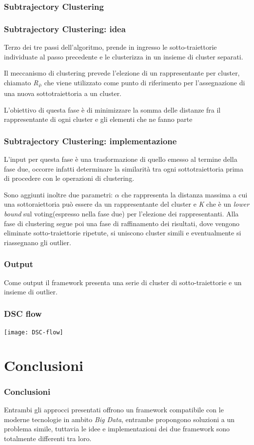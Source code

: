 \documentclass{beamer}
\begin{document}
\subsubsection{Subtrajectory Clustering}

\begin{frame}
		\frametitle{Subtrajectory Clustering: idea}
		Terzo dei tre passi dell'algoritmo, prende in ingresso le sotto-traiettorie individuate al passo precedente e le clusterizza in un insieme di cluster separati.
		
		Il meccanismo di clustering prevede l'elezione di un rappresentante per cluster, chiamato \textit{R\textsubscript{i}}, che viene utilizzato come punto di riferimento per l'assegnazione di una nuova sottotraiettoria a un cluster.
		
		L'obiettivo di questa fase  è di minimizzare la somma delle distanze fra il rappresentante di ogni cluster e gli elementi che ne fanno parte
\end{frame}

\begin{frame}
	\frametitle{Subtrajectory Clustering: implementazione}
 	L'input per questa fase è una trasformazione di quello emesso al termine della fase due, occorre infatti determinare la similarità tra ogni sottotraiettoria prima di procedere con le operazioni di clustering.
 	
 	Sono aggiunti inoltre due parametri: $\alpha$ che rappresenta la distanza massima a cui una sottoraiettoria può essere da un rappresentante del cluster e \textit{K} che è un \textit{lower bound} sul voting(espresso nella fase due) per l'elezione dei rappresentanti.
 	Alla fase di clustering segue poi una fase di raffinamento dei risultati, dove vengono eliminate sotto-traiettorie ripetute, si uniscono cluster simili e eventualmente si riassegnano gli outlier.\ 
\end{frame}

\begin{frame}
	\frametitle{Output}
	Come output il framework presenta una serie di cluster di sotto-traiettorie e un insieme di outlier.
\end{frame}

\begin{frame}
	\frametitle{DSC flow}
\begin{center}
	\texttt{[image: DSC-flow]}
\end{center}
\end{frame}

\section{Conclusioni}
\begin{frame}
	\frametitle{Conclusioni}
	Entrambi gli approcci presentati offrono un framework compatibile con le moderne tecnologie in ambito \textit{Big Data}, entrambe propongono soluzioni a un problema simile, tuttavia le idee e implementazioni dei due framework sono totalmente differenti tra loro.
\end{frame}




\begin{frame}
\titlepage %
\end{frame}

\end{document}
